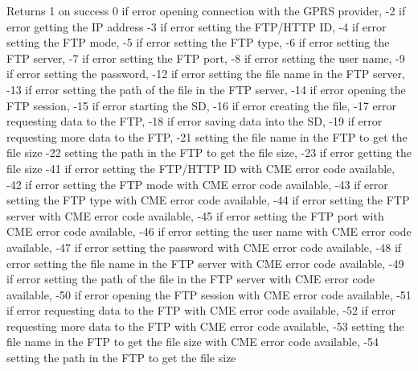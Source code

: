 \begin{DoxyReturn}{Returns}
\textquotesingle{}1\textquotesingle{} on success \textquotesingle{}0\textquotesingle{} if error opening connection with the G\+P\+RS provider, \textquotesingle{}-\/2\textquotesingle{} if error getting the IP address \textquotesingle{}-\/3\textquotesingle{} if error setting the F\+T\+P/\+H\+T\+TP ID, \textquotesingle{}-\/4\textquotesingle{} if error setting the F\+TP mode, \textquotesingle{}-\/5\textquotesingle{} if error setting the F\+TP type, \textquotesingle{}-\/6\textquotesingle{} if error setting the F\+TP server, \textquotesingle{}-\/7\textquotesingle{} if error setting the F\+TP port, \textquotesingle{}-\/8\textquotesingle{} if error setting the user name, \textquotesingle{}-\/9\textquotesingle{} if error setting the password, \textquotesingle{}-\/12\textquotesingle{} if error setting the file name in the F\+TP server, \textquotesingle{}-\/13\textquotesingle{} if error setting the path of the file in the F\+TP server, \textquotesingle{}-\/14\textquotesingle{} if error opening the F\+TP session, \textquotesingle{}-\/15\textquotesingle{} if error starting the SD, \textquotesingle{}-\/16\textquotesingle{} if error creating the file, \textquotesingle{}-\/17\textquotesingle{} error requesting data to the F\+TP, \textquotesingle{}-\/18\textquotesingle{} if error saving data into the SD, \textquotesingle{}-\/19\textquotesingle{} if error requesting more data to the F\+TP, \textquotesingle{}-\/21\textquotesingle{} setting the file name in the F\+TP to get the file size \textquotesingle{}-\/22\textquotesingle{} setting the path in the F\+TP to get the file size, \textquotesingle{}-\/23\textquotesingle{} if error getting the file size \textquotesingle{}-\/41\textquotesingle{} if error setting the F\+T\+P/\+H\+T\+TP ID with C\+ME error code available, \textquotesingle{}-\/42\textquotesingle{} if error setting the F\+TP mode with C\+ME error code available, \textquotesingle{}-\/43\textquotesingle{} if error setting the F\+TP type with C\+ME error code available, \textquotesingle{}-\/44\textquotesingle{} if error setting the F\+TP server with C\+ME error code available, \textquotesingle{}-\/45\textquotesingle{} if error setting the F\+TP port with C\+ME error code available, \textquotesingle{}-\/46\textquotesingle{} if error setting the user name with C\+ME error code available, \textquotesingle{}-\/47\textquotesingle{} if error setting the password with C\+ME error code available, \textquotesingle{}-\/48\textquotesingle{} if error setting the file name in the F\+TP server with C\+ME error code available, \textquotesingle{}-\/49\textquotesingle{} if error setting the path of the file in the F\+TP server with C\+ME error code available, \textquotesingle{}-\/50\textquotesingle{} if error opening the F\+TP session with C\+ME error code available, \textquotesingle{}-\/51\textquotesingle{} if error requesting data to the F\+TP with C\+ME error code available, \textquotesingle{}-\/52\textquotesingle{} if error requesting more data to the F\+TP with C\+ME error code available, \textquotesingle{}-\/53\textquotesingle{} setting the file name in the F\+TP to get the file size with C\+ME error code available, \textquotesingle{}-\/54\textquotesingle{} setting the path in the F\+TP to get the file size 
\end{DoxyReturn}
